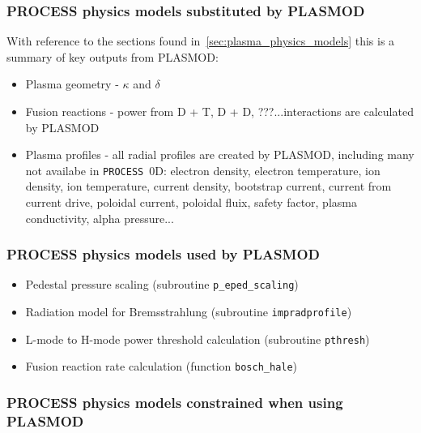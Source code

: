 \documentclass[11pt,a4paper]{report}
\newcommand{\process}{\mbox{\texttt{PROCESS}}}
\begin{document}
\subsubsection*{PROCESS physics models substituted by PLASMOD}
With reference to the sections found in~\ref{sec:plasma_physics_models} this is a summary of key outputs from PLASMOD:

\begin{itemize}
\item Plasma geometry - $\kappa$ and $\delta$
\item Fusion reactions - power from D + T, D + D, ???...interactions are calculated by PLASMOD
\item Plasma profiles - all radial profiles are created by PLASMOD, including many not availabe in \process\ 0D: electron density, electron temperature, ion density, ion temperature, current density, bootstrap current, current from current drive, poloidal current, poloidal fluix, safety factor, plasma conductivity, alpha pressure...
\end{itemize}

\subsubsection*{PROCESS physics models used by PLASMOD}

\begin{itemize}
\item Pedestal pressure scaling (subroutine \texttt{p\_eped\_scaling})
\item Radiation model for Bremsstrahlung (subroutine \texttt{impradprofile})
\item L-mode to H-mode power threshold calculation (subroutine \texttt{pthresh})
\item Fusion reaction rate calculation (function \texttt{bosch\_hale})
\end{itemize}

\subsubsection*{PROCESS physics models constrained when using PLASMOD}
\end{document}

